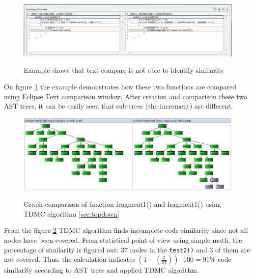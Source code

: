 \documentclass{report}
\begin{document}
\vspace{4mm}

\begin{figure}[h]
  \centering
  \includegraphics[width=1.00\textwidth]{Figures/AST-optimization/text-to-text-compare}\\[0.1cm]
  \caption[Example shows that text compare is not able to identify similarity]{Example shows that text compare is not able to identify similarity}
  \label{fig:text-to-text-compare}
\end{figure}

On figure \ref{fig:text-to-text-compare} the example demonstrates how these two functions are compared using Eclipse Text comparison window. After creation and comparison these two AST trees, it can be easily seen that sub-trees (the increment) are different.

\begin{figure}[h]
  \centering
  \includegraphics[width=1.00\textwidth]{Figures/AST-optimization/tree-compared1}\\[0.1cm]
  \caption[Graph comparison on similar AST trees using TDMC algorithm]{Graph comparison of function fragment1() and fragment1() using TDMC algorithm \ref{sec:topdown}}
  \label{fig:ast-graph-compare-similar-tdmc}
\end{figure}

From the figure \ref{fig:ast-graph-compare-similar-tdmc} TDMC algorithm finds incomplete code similarity since not all nodes have been covered. From statistical point of view using simple math, the percentage of similarity is figured out: 37 nodes in the \texttt{test2()} and 3 of them are not covered. Thus, the calculation indicates  $\left ( 1 - \left (\frac{3}{37} \right ) \right )\cdot 100 = 91\%$ code similarity according to AST trees and applied TDMC algorithm.
\end{document}
